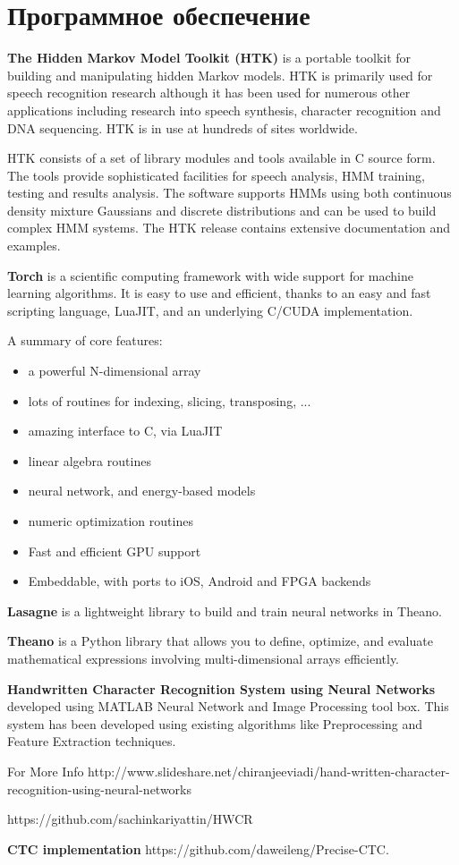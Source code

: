 \chapter{Программное обеспечение} \label{AppendixA}


\textbf{The Hidden Markov Model Toolkit (HTK)} is a portable toolkit for building and manipulating hidden Markov models. HTK is primarily used for speech recognition research although it has been used for numerous other applications including research into speech synthesis, character recognition and DNA sequencing. HTK is in use at hundreds of sites worldwide.

HTK consists of a set of library modules and tools available in C source form. The tools provide sophisticated facilities for speech analysis, HMM training, testing and results analysis. The software supports HMMs using both continuous density mixture Gaussians and discrete distributions and can be used to build complex HMM systems. The HTK release contains extensive documentation and examples. \cite{young2006htk}

\textbf{Torch} is a scientific computing framework with wide support for machine learning algorithms. It is easy to use and efficient, thanks to an easy and fast scripting language, LuaJIT, and an underlying C/CUDA implementation.

\noindent A summary of core features:
\begin{itemize}
  \item a powerful N-dimensional array
  \item lots of routines for indexing, slicing, transposing, ...
  \item amazing interface to C, via LuaJIT
  \item linear algebra routines
  \item neural network, and energy-based models
  \item numeric optimization routines
  \item Fast and efficient GPU support
  \item Embeddable, with ports to iOS, Android and FPGA backends
\end{itemize}

\textbf{Lasagne} is a lightweight library to build and train neural networks in Theano.

\textbf{Theano} is a Python library that allows you to define, optimize, and evaluate mathematical expressions involving multi-dimensional arrays efficiently.


\textbf{Handwritten Character Recognition System using Neural Networks} developed using MATLAB Neural Network and Image Processing tool box. This system has been developed using existing algorithms like Preprocessing and Feature Extraction techniques.

For More Info http://www.slideshare.net/chiranjeeviadi/hand-written-character-recognition-using-neural-networks

https://github.com/sachinkariyattin/HWCR


\textbf{CTC implementation} https://github.com/daweileng/Precise-CTC.




